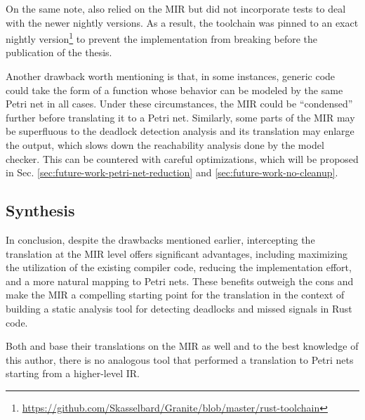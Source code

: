 On the same note, \cite{meyer2020} also relied on the \acrshort{MIR}
but did not incorporate tests to deal with the newer nightly versions.
As a result, the toolchain was pinned to an exact nightly
version\footnote{\url{https://github.com/Skasselbard/Granite/blob/master/rust-toolchain}}
to prevent the implementation from breaking before the publication of the thesis.

Another drawback worth mentioning is that, in some instances,
generic code could take the form of a function whose behavior can be modeled
by the same Petri net in all cases.
Under these circumstances, the \acrshort{MIR} could be ``condensed'' further
before translating it to a Petri net.
Similarly, some parts of the \acrshort{MIR} may be superfluous
to the deadlock detection analysis and its translation may enlarge the output,
which slows down the reachability analysis done by the model checker.
This can be countered with careful optimizations,
which will be proposed in Sec. \ref{sec:future-work-petri-net-reduction}
and \ref{sec:future-work-no-cleanup}.

\subsection{Synthesis}

In conclusion, despite the drawbacks mentioned earlier,
intercepting the translation at the \acrshort{MIR} level offers significant advantages,
including maximizing the utilization of the existing compiler code,
reducing the implementation effort, and a more natural mapping to Petri nets.
These benefits outweigh the cons and make the \acrshort{MIR}
a compelling starting point for the translation
in the context of building a static analysis tool
for detecting deadlocks and missed signals in Rust code.

Both \cite{meyer2020} and \cite{zhang2022deadlocks} base their translations
on the \acrshort{MIR} as well and to the best knowledge of this author, there is
no analogous tool that performed a translation to Petri nets
starting from a higher-level \acrshort{IR}.